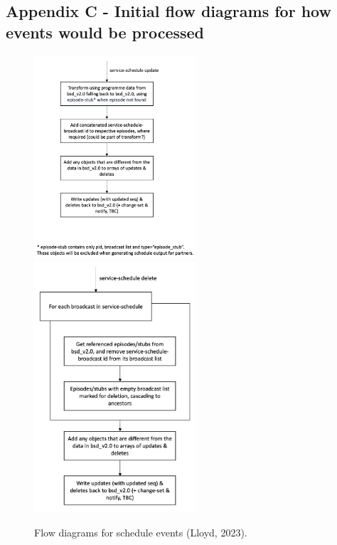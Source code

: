  \newpage
  \subsection{Appendix C - Initial flow diagrams for how events would be processed}
    \label{sec:AppendixC}
    \begin{figure}[H]
      \centering
      \includegraphics[width=6cm]{assets/initialDesign/scheduleUpdate.jpeg}
      \includegraphics[width=6cm]{assets/initialDesign/scheduleDelete.jpeg}
      \caption{Flow diagrams for schedule events (Lloyd, 2023).}
      \label{fig:initialDesignSchedules}
    \end{figure}


